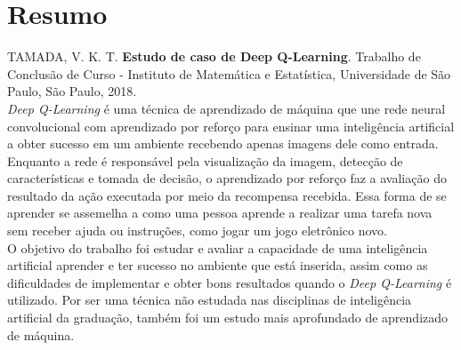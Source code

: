\chapter*{Resumo}
%
\noindent%
TAMADA, V. K. T. \textbf{Estudo de caso de Deep Q-Learning}. Trabalho de Conclusão de Curso
 - Instituto de Matemática e Estatística, Universidade de São Paulo,
São Paulo, 2018.
\\

\textit{Deep Q-Learning} é uma técnica de aprendizado de máquina que une rede neural convolucional com aprendizado por reforço para ensinar uma inteligência artificial a obter sucesso em um ambiente recebendo apenas imagens dele como entrada.
Enquanto a rede é responsável pela visualização da imagem, detecção de características e tomada de decisão, o aprendizado por reforço faz a avaliação do resultado da ação executada por meio da recompensa recebida.
Essa forma de se aprender se assemelha a como uma pessoa aprende a realizar uma tarefa nova sem receber ajuda ou instruções, como jogar um jogo eletrônico novo.
\\

O objetivo do trabalho foi estudar e avaliar a capacidade de uma inteligência artificial aprender e ter sucesso no ambiente que está inserida, assim como as dificuldades de implementar e obter bons resultados quando o \textit{Deep Q-Learning} é utilizado.
Por ser uma técnica não estudada nas disciplinas de inteligência artificial da graduação, também foi um estudo mais aprofundado de aprendizado de máquina.
\\

